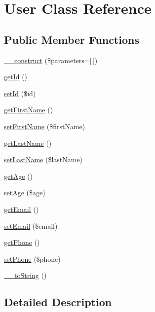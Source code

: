 \hypertarget{class_user}{}\section{User Class Reference}
\label{class_user}
\subsection*{Public Member Functions}
\begin{DoxyCompactItemize}
\item 
\hyperlink{class_user_ae8aeb1b25337214f485072dcfd3838bf}{\+\_\+\+\_\+construct} (\$parameters=\mbox{[}$\,$\mbox{]})
\item 
\hyperlink{class_user_a39ad6e655fcc40623b9af2203cd7afa5}{get\+Id} ()
\item 
\hyperlink{class_user_a5c5a688ef7eb0c1c695a00569250dee1}{set\+Id} (\$id)
\item 
\hyperlink{class_user_a1797d3f80cc25452b4e97232ef14c6be}{get\+First\+Name} ()
\item 
\hyperlink{class_user_a3c626d0aca50df67aa89793615b7ffd1}{set\+First\+Name} (\$first\+Name)
\item 
\hyperlink{class_user_af0efc9a6afcaf0774ef627dbc4dbe43e}{get\+Last\+Name} ()
\item 
\hyperlink{class_user_acbe8bdd002179a3bc115ec7a9afb7e0b}{set\+Last\+Name} (\$last\+Name)
\item 
\hyperlink{class_user_a5a62afd4ce8cd694d7737b9ebbdd51d7}{get\+Age} ()
\item 
\hyperlink{class_user_a2c89f54beabff9157106c24878b70bca}{set\+Age} (\$age)
\item 
\hyperlink{class_user_acf082b95b344df14b9e8a6c09868dbcd}{get\+Email} ()
\item 
\hyperlink{class_user_a018ae17e436e09134922835cdd3235a7}{set\+Email} (\$email)
\item 
\hyperlink{class_user_acbf53279af16610c85d5f355860dd42b}{get\+Phone} ()
\item 
\hyperlink{class_user_a81a82307eef393fb41f0b3b76375472c}{set\+Phone} (\$phone)
\item 
\hyperlink{class_user_ab3d7e8f713f819b4121fb0bc38523c12}{\+\_\+\+\_\+to\+String} ()
\end{DoxyCompactItemize}


\subsection{Detailed Description}


